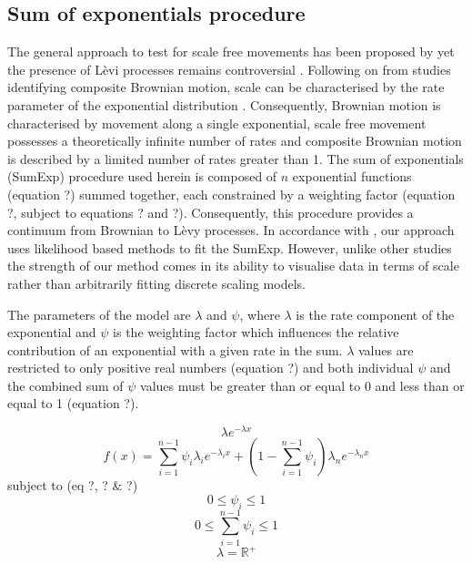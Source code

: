 \documentclass[11pt,usenames,dvipsnames]{article}
\begin{document}
\subsection{Sum of exponentials procedure}

The general approach to test for scale free movements has been proposed by \cite{Murphy2007} yet the presence of L\`evi processes remains controversial \citep{Pyke2015}. Following on from studies identifying composite Brownian motion, scale can be characterised by the rate parameter of the exponential distribution \citep{Petrovskii2011}. Consequently, Brownian motion is characterised by movement along a single exponential, scale free movement possesses a theoretically infinite number of rates and composite Brownian motion is described by a limited number of rates greater than 1. The sum of exponentials (SumExp) procedure used herein is composed of $n$ exponential functions (equation ?) summed together, each constrained by a weighting factor (equation ?, subject to equations ? and ?). Consequently, this procedure provides a continuum from Brownian to L\`evy processes. In accordance with \cite{Murphy2007}, our approach uses likelihood based methods to fit the SumExp. However, unlike other studies \citep{Petrovskii2011, Sakamoto2017, Gautestad2012, Zhao2016} the strength of our method comes in its ability to visualise data in terms of scale rather than arbitrarily fitting discrete scaling models.

The parameters of the model are $\lambda$ and $\psi$, where $\lambda$ is the rate component of the exponential and $\psi$ is the weighting factor which influences the relative contribution of an exponential with a given rate in the sum. $\lambda$ values are restricted to only positive real numbers (equation ?) and both individual $\psi$ and the combined sum of $\psi$ values must be greater than or equal to 0 and less than or equal to 1 (equation ?).

\begin{equation}
\lambda e^{-\lambda x}
\end{equation}
\begin{equation}
f(x) = \sum_{i=1}^{n-1} \psi_i \lambda_i e^{-\lambda_i x} + \left(1 - \sum_{i=1}^{n-1}\psi_i\right) \lambda_n e^{-\lambda_n x}
\end{equation}
subject to (eq ?, ? \& ?)
\begin{equation}
0\leq \psi_i \leq 1
\end{equation}
\begin{equation}
0\leq \sum_{i=1}^{n-1}\psi_i \leq 1
\end{equation}
\begin{equation}
\lambda = \mathbb{R}^+
\end{equation}
\end{document}
